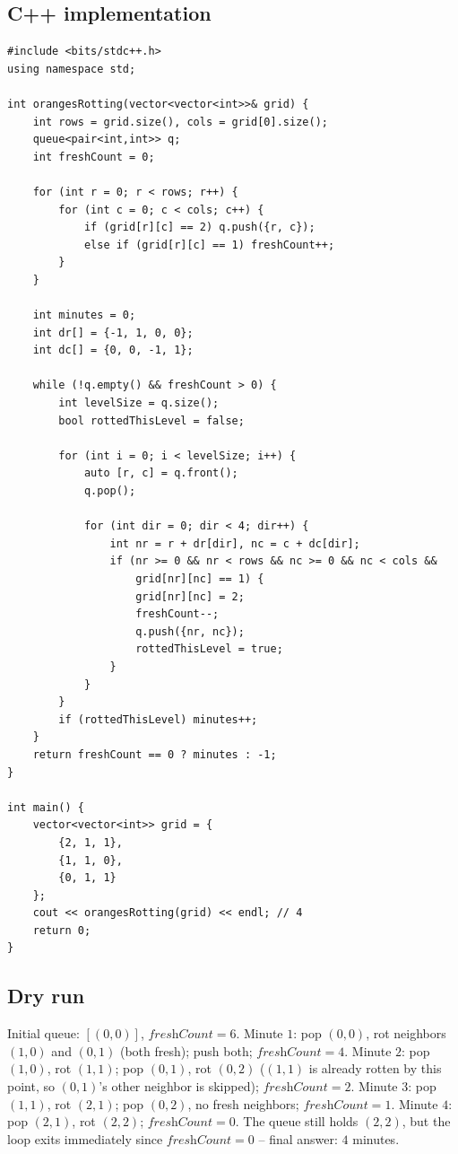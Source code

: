 \subsection*{C++ implementation}

\begin{lstlisting}
#include <bits/stdc++.h>
using namespace std;

int orangesRotting(vector<vector<int>>& grid) {
    int rows = grid.size(), cols = grid[0].size();
    queue<pair<int,int>> q;
    int freshCount = 0;

    for (int r = 0; r < rows; r++) {
        for (int c = 0; c < cols; c++) {
            if (grid[r][c] == 2) q.push({r, c});
            else if (grid[r][c] == 1) freshCount++;
        }
    }

    int minutes = 0;
    int dr[] = {-1, 1, 0, 0};
    int dc[] = {0, 0, -1, 1};

    while (!q.empty() && freshCount > 0) {
        int levelSize = q.size();
        bool rottedThisLevel = false;

        for (int i = 0; i < levelSize; i++) {
            auto [r, c] = q.front();
            q.pop();

            for (int dir = 0; dir < 4; dir++) {
                int nr = r + dr[dir], nc = c + dc[dir];
                if (nr >= 0 && nr < rows && nc >= 0 && nc < cols &&
                    grid[nr][nc] == 1) {
                    grid[nr][nc] = 2;
                    freshCount--;
                    q.push({nr, nc});
                    rottedThisLevel = true;
                }
            }
        }
        if (rottedThisLevel) minutes++;
    }
    return freshCount == 0 ? minutes : -1;
}

int main() {
    vector<vector<int>> grid = {
        {2, 1, 1},
        {1, 1, 0},
        {0, 1, 1}
    };
    cout << orangesRotting(grid) << endl; // 4
    return 0;
}
\end{lstlisting}

\subsection*{Dry run}


Initial queue: $[(0,0)]$, $\textit{freshCount}=6$. Minute $1$: pop
$(0,0)$, rot neighbors $(1,0)$ and $(0,1)$ (both fresh); push both;
$\textit{freshCount}=4$. Minute $2$: pop $(1,0)$, rot $(1,1)$; pop
$(0,1)$, rot $(0,2)$ ($(1,1)$ is already rotten by this point, so
$(0,1)$'s other neighbor is skipped); $\textit{freshCount}=2$. Minute
$3$: pop $(1,1)$, rot $(2,1)$; pop $(0,2)$, no fresh neighbors;
$\textit{freshCount}=1$. Minute $4$: pop $(2,1)$, rot $(2,2)$;
$\textit{freshCount}=0$. The queue still holds $(2,2)$, but the loop
exits immediately since $\textit{freshCount}=0$ -- final answer: $4$
minutes.

